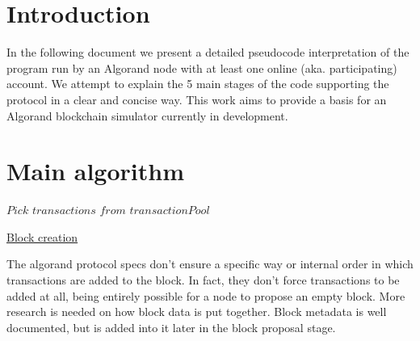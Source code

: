 \documentclass[10pt,a4paper]{article}
\begin{document}
\section{Introduction}
In the following document we present a detailed pseudocode interpretation 
of the program run by an Algorand node with at least one online (aka. 
participating)
account. We attempt to explain the 5 main stages of the code supporting 
the protocol in a clear and concise way.
This work aims to provide a basis for an Algorand blockchain simulator 
currently in development.

\section{Main algorithm}

\begin{algorithm}
    \begin{algorithmic}[1]
    
    \State $Pick$ $transactions$ $from$ $transactionPool$
    
    \EndFunction
    \end{algorithmic}
    \caption{\underline{Block creation}}
    \label{alg:fuerza_bruta}
\end{algorithm}

The algorand protocol specs don't ensure a specific way or internal order in which transactions are added to the block.
In fact, they don't force transactions to be added at all, being entirely possible for a node to propose an empty block.
More research is needed on how block data is put together.
Block metadata is well documented, but is added into it later in the block proposal stage.



\end{document}
